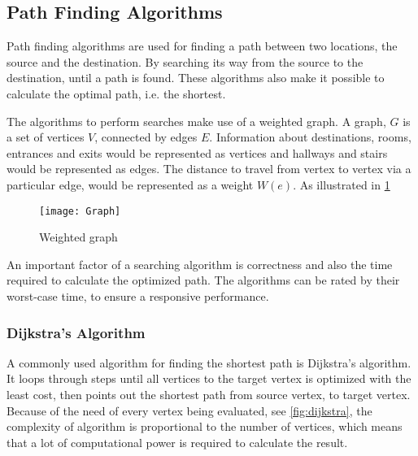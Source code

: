 




\subsection{Path Finding Algorithms}

  Path finding algorithms are used for finding a path between two locations, the source and the destination. By searching its way from the source to the destination, until a path is found. These algorithms also make it possible to calculate the optimal path, i.e. the shortest.

  The algorithms to perform searches make use of a weighted graph. A graph, $G$ is a set of vertices $V$, connected by edges $E$.
  Information about destinations, rooms, entrances and exits would be represented as vertices and hallways and stairs would be represented as edges. The distance to travel from vertex to vertex via a particular edge, would be represented as a weight $W(e)$. As illustrated in \cref{fig:graph}

  \begin{figure}[ht!]
    \centering
    \texttt{[image: Graph]}
    \caption{Weighted graph}
    \label{fig:graph}
  \end{figure}

  An important factor of a searching algorithm is correctness and also the time required to calculate the optimized path.
  The algorithms can be rated by their worst-case time, to ensure a responsive performance.

  \subsubsection{Dijkstra's Algorithm}

  A commonly used algorithm for finding the shortest path is Dijkstra's algorithm. It loops through steps until all vertices to the target vertex is optimized with the least cost, then points out the shortest path from source vertex, to target vertex. Because of the need of every vertex being evaluated, see \cref{fig:dijkstra}, the complexity of algorithm is proportional to the number of vertices, which means that a lot of computational power is required to calculate the result.

